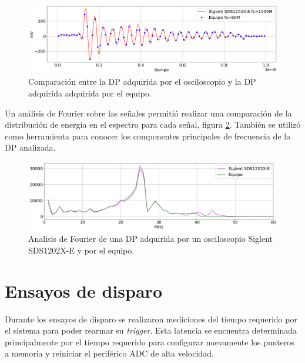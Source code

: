 \vspace{5mm}


\begin{figure}[ht]
	\centering
	\includegraphics[width=137mm]{./Figures/compPulsos.png}
	\caption{Comparación entre la DP adquirida por el osciloscopio y la DP adquirida adquirida por el equipo.}
	\label{fig:compPulsos}
\end{figure}

\vspace{5mm}

Un análisis de Fourier sobre las señales permitió realizar una comparación de la distribución de energía en el espectro para cada señal, figura \ref{fig:compEspectro}. También se utilizó como herramienta para conocer los componentes principales de frecuencia de la DP analizada.

\vspace{5mm}

\begin{figure}[ht]
	\centering
	\includegraphics[width=137mm]{./Figures/compEspectro.png}
	\caption{Analisis de Fourier de una DP adquirida por un osciloscopio Siglent SDS1202X-E y  por el equipo.}
	\label{fig:compEspectro}
\end{figure}

\vspace{5mm}
\newpage

\section{Ensayos de disparo}
Durante los ensayos de disparo se realizaron mediciones del tiempo requerido por el sistema para poder rearmar su \textit{trigger}. Esta latencia se encuentra determinada principalmente por el tiempo requerido para configurar nuevamente los punteros a memoria y reiniciar el periférico ADC de alta velocidad. 

